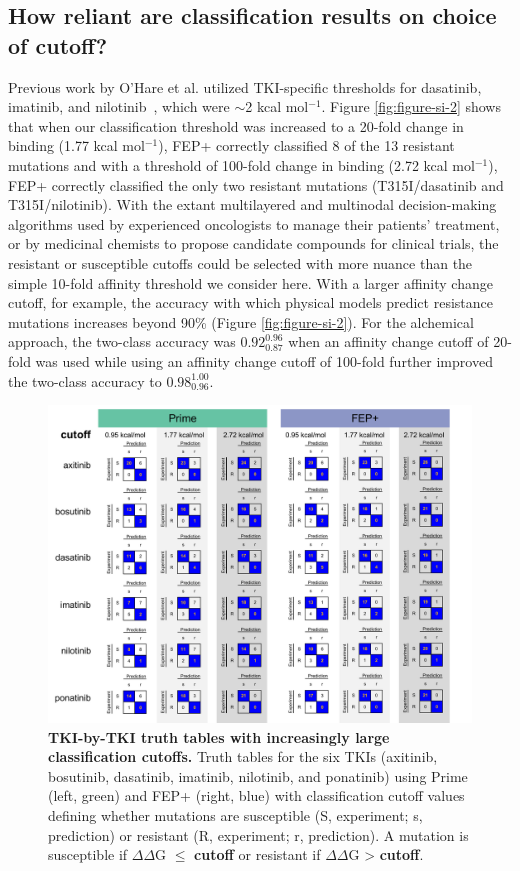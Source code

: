 \documentclass[phd,tocprelim]{cornell}
\begin{document}
\subsection{How reliant are classification results on choice of cutoff?}
Previous work by O'Hare et al. utilized TKI-specific thresholds for dasatinib, imatinib, and nilotinib~\citep{OHare:Clin.CancerRes.:2005}, which were $\sim$2 kcal mol$^{-1}$. Figure \ref{fig:figure-si-2} shows that when our classification threshold was increased to a 20-fold change in binding (1.77 kcal mol$^{-1}$), FEP+ correctly classified 8 of the 13 resistant mutations and with a threshold of 100-fold change in binding (2.72 kcal mol$^{-1}$), FEP+ correctly classified the only two resistant mutations (T315I/dasatinib and T315I/nilotinib).
With the extant multilayered and multinodal decision-making algorithms used by experienced oncologists to manage their patients' treatment, or by medicinal chemists to propose candidate compounds for clinical trials, the resistant or susceptible cutoffs could be selected with more nuance than the simple 10-fold affinity threshold we consider here.
With a larger affinity change cutoff, for example, the accuracy with which physical models predict resistance mutations increases beyond 90\% (Figure \ref{fig:figure-si-2}).
For the alchemical approach, the two-class accuracy was $0.92^{0.96}_{0.87}$ when an affinity change cutoff of 20-fold was used while using an affinity change cutoff of 100-fold further improved the two-class accuracy to $0.98^{1.00}_{0.96}$.

\begin{landscape}
	\begin{figure}[p]
		\centering
		\includegraphics[width=0.8\linewidth]{figures/abl-supplementary-figure-2.pdf}
		\caption[TKI-by-TKI truth tables with increasingly large classification cutoffs.]{
			{\bf TKI-by-TKI truth tables with increasingly large classification cutoffs.}
			Truth tables for the six TKIs (axitinib, bosutinib, dasatinib, imatinib, nilotinib, and ponatinib) using Prime (left, green) and FEP+ (right, blue) with classification cutoff values defining whether mutations are susceptible (S, experiment; s, prediction) or resistant (R, experiment; r, prediction). 
			A mutation is susceptible if $\Delta\Delta$G $\le$ \textbf{cutoff} or resistant if $\Delta\Delta$G > \textbf{cutoff}.
		}
		\label{fig:abl-figure-si-2}
	\end{figure}
\end{landscape}
\end{document}

